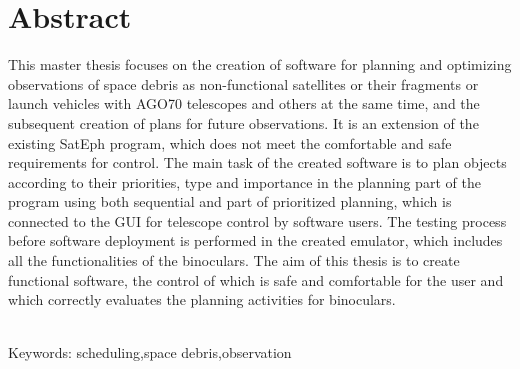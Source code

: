 \documentclass[12pt, a4paper, oneside]{book}
\begin{document}
\chapter*{Abstract}\label{chap:abstract_en}
This master thesis focuses on the creation of software for planning and optimizing observations of space debris as non-functional satellites or their fragments or launch vehicles with AGO70 telescopes and others at the same time, and the subsequent creation of plans for future observations. It is an extension of the existing SatEph program, which does not meet the comfortable and safe requirements for control. The main task of the created software is to plan objects according to their priorities, type and importance in the planning part of the program using both sequential and part of prioritized planning, which is connected to the GUI for telescope control by software users. The testing process before software deployment is performed in the created emulator, which includes all the functionalities of the binoculars. The aim of this thesis is to create functional software, the control of which is safe and comfortable for the user and which correctly evaluates the planning activities for binoculars.

~\\
Keywords: scheduling,space debris,observation
\vfill\eject 

\tableofcontents

\mainmatter









\backmatter

\nocite{*}



\listoffigures
\end{document}
